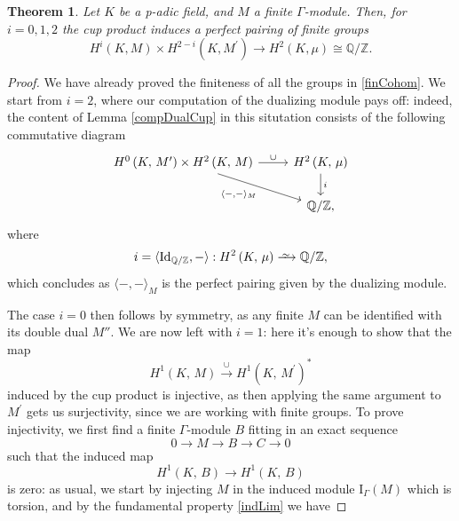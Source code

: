 \documentclass[a4paper]{article}
\def\Q{\mathbb{Q}}
\def\Z{\mathbb{Z}}
\def\K{K}
\renewcommand{\H}[3]{H^{#1}\left( #2, \, #3 \right)}
\newcommand{\HH}[2]{H^2\left( #1, \, #2 \right)}
\newcommand{\Ind}[2]{\mathrm{I}_{#1}(#2)}
\newcommand\Iso{\xrightarrow{
   \,\smash{\raisebox{-0.65ex}{\ensuremath{\scriptstyle\sim}}}\,}}
\newtheorem{theorem}{Theorem}[section]
\theoremstyle{definition}
\theoremstyle{definition}
\theoremstyle{remark}
\begin{document}
\begin{theorem}
    Let $\K$ be a p-adic field, and $M$ a finite $\Gamma$-module.
    Then, for $i=0,1,2$ the cup product induces a perfect pairing of finite groups
    \begin{equation*}
        H^i(\K, M) \times H^{2-i}(\K, M^{\prime}) \to H^2(\K, \mu) \cong \Q/\Z.
    \end{equation*}
\end{theorem}
\begin{proof}
    We have already proved the finiteness of all the groups in \eqref{finCohom}.
    We start from $i=2$, where our computation of the dualizing module pays off: indeed, the content of Lemma \eqref{compDualCup}
    in this situtation consists of the following commutative diagram
    \begin{equation*}
        \begin{tikzcd}
            {\H{0}{\K}{M^\prime}  \times \HH{\K}{M}} \ar[swap, rd, "\langle - {,} - \rangle_M "] \ar[r, "\cup"] & \HH{\K}{\mu} \ar[d, "i"] \\
            & \Q/\Z,
        \end{tikzcd}
    \end{equation*}
    where
    \[
        i = \langle \operatorname{Id}_{\Q/\Z}, - \rangle : \H{2}{\K}{\mu} \Iso \Q/\Z,
    \]
    which concludes as $\langle -{,}- \rangle_M$ is the perfect pairing given by the dualizing module.

    The case $i=0$ then follows by symmetry, as any finite $M$ can be identified with its double dual $M''$.
    We are now left with $i=1$: here it's enough to show that the map
    \[
        \H{1}{\K}{M} \overset{\cup}{\to} \H{1}{\K}{M^\prime}^*
    \]
    induced by the cup product is injective, as then applying the same argument to $M^\prime$ gets us surjectivity, since we are working with finite groups.
    To prove injectivity, we first find a finite $\Gamma$-module $B$ fitting in an exact sequence
    \begin{equation}\label{injSeq}
        0\to M\to B\to C\to 0
    \end{equation}
    such that the induced map
    \[
        \H{1}{\K}{B}\to\H{1}{\K}{B}
    \]
    is zero:
    as usual, we start by injecting $M$ in the induced module $\Ind{\Gamma}{M}$ which is torsion, and by the fundamental property \eqref{indLim} we have


\end{proof}
\end{document}
